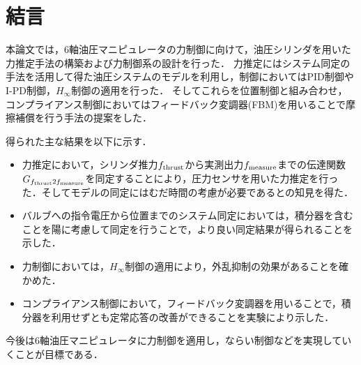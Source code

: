 \chapter{結言}
本論文では，6軸油圧マニピュレータの力制御に向けて，油圧シリンダを用いた力推定手法の構築および力制御系の設計を行った．
力推定にはシステム同定の手法を活用して得た油圧システムのモデルを利用し，制御においてはPID制御やI-PD制御，$H_\infty$制御の適用を行った．
そしてこれらを位置制御と組み合わせ，コンプライアンス制御においてはフィードバック変調器(FBM)を用いることで摩擦補償を行う手法の提案をした．

得られた主な結果を以下に示す．
\begin{itemize}
    \item 力推定において，シリンダ推力$f_\mathrm{thrust}$から実測出力$f_\mathrm{measure}$までの伝達関数$G_{f_\mathrm{thrust}2f_\mathrm{measure}}$を同定することにより，圧力センサを用いた力推定を行った．そしてモデルの同定にはむだ時間の考慮が必要であるとの知見を得た．
    \item バルブへの指令電圧から位置までのシステム同定においては，積分器を含むことを陽に考慮して同定を行うことで，より良い同定結果が得られることを示した．
    \item 力制御においては，$H_\infty$制御の適用により，外乱抑制の効果があることを確かめた．
    \item コンプライアンス制御において，フィードバック変調器を用いることで，積分器を利用せずとも定常応答の改善ができることを実験により示した．
\end{itemize}

今後は6軸油圧マニピュレータに力制御を適用し，ならい制御などを実現していくことが目標である．
